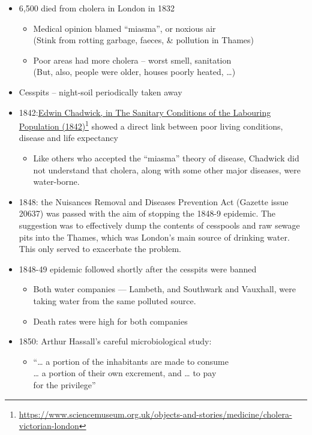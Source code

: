 \documentclass[
  10pt,
  b5paper]{book}
\providecommand{\tightlist}{%
  \setlength{\itemsep}{0pt}\setlength{\parskip}{0pt}}
\begin{document}
\begin{itemize}
\tightlist
\item
  6,500 died from cholera in London in 1832

  \begin{itemize}
  \tightlist
  \item
    Medical opinion blamed ``miasma'', or noxious air\\
    (Stink from rotting garbage, faeces, \& pollution in Thames)
  \item
    Poor areas had more cholera -- worst smell, sanitation\\
    (But, also, people were older, houses poorly heated, \ldots)
  \end{itemize}
\item
  Cesspits -- night-soil periodically taken away
\item
  1842:\href{https://www.sciencemuseum.org.uk/objects-and-stories/medicine/cholera-victorian-london}{Edwin Chadwick, in The Sanitary Conditions of the Labouring Population (1842)}\footnote{\url{https://www.sciencemuseum.org.uk/objects-and-stories/medicine/cholera-victorian-london}}
  showed a direct link between poor living conditions, disease and life expectancy

  \begin{itemize}
  \tightlist
  \item
    Like others who accepted the ``miasma'' theory of disease, Chadwick did
    not understand that cholera, along with some other major diseases, were water-borne.
  \end{itemize}
\item
  1848: the Nuisances Removal and Diseases Prevention Act (Gazette issue 20637) was passed with the aim of stopping the 1848-9 epidemic. The suggestion was to
  effectively dump the contents of cesspools and raw
  sewage pits into the Thames, which was London's main source of drinking water. This only served to exacerbate the problem.
\item
  1848-49 epidemic followed shortly after the cesspits were banned

  \begin{itemize}
  \tightlist
  \item
    Both water companies --- Lambeth, and Southwark and Vauxhall,
    were taking water from the same polluted source.
  \item
    Death rates were high for both companies
  \end{itemize}
\item
  1850: Arthur Hassall's careful microbiological study:

  \begin{itemize}
  \tightlist
  \item
    ``\ldots{} a portion of the inhabitants are made to consume\\
    \ldots{} a portion of their own excrement, and \ldots{} to pay\\
    for the privilege'' \citep{hassall1850memoir}
  \end{itemize}
\end{itemize}
\end{document}
